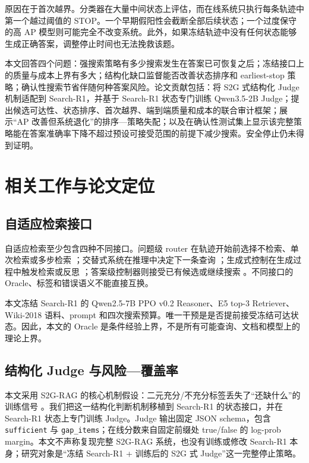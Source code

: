 \documentclass[UTF8,fontset=fandol,11pt,a4paper]{ctexart}
\newcommand{\model}[1]{\texttt{#1}}
\begin{document}
原因在于首次越界。分类器在大量中间状态上评估，而在线系统只执行每条轨迹中第一个越过阈值的 STOP。一个早期假阳性会截断全部后续状态；一个过度保守的高 AP 模型则可能完全不改变系统。此外，如果冻结轨迹中没有任何状态能够生成正确答案，调整停止时间也无法挽救该题。

本文回答四个问题：强搜索策略有多少搜索发生在答案已可恢复之后；冻结接口上的质量与成本上界有多大；结构化缺口监督能否改善状态排序和 earliest-stop 策略；确认性搜索节省伴随何种答案风险。论文贡献包括：将 S2G 式结构化 Judge 机制适配到 Search-R1，并基于 Search-R1 状态专门训练 Qwen3.5-2B Judge；提出候选可达性、状态排序、首次越界、端到端质量和成本的联合审计框架；展示“AP 改善但系统退化”的排序—策略失配；以及在确认性测试集上显示该完整策略能在答案准确率下降不超过预设可接受范围的前提下减少搜索。安全停止仍未得到证明。

\section{相关工作与论文定位}

\subsection{自适应检索接口}

自适应检索至少包含四种不同接口。问题级 router 在轨迹开始前选择不检索、单次检索或多步检索 \citep{jeong2024adaptiverag}；交替式系统在推理中决定下一条查询 \citep{trivedi2023ircot,jin2025searchr1}；生成式控制在生成过程中触发检索或反思 \citep{asai2023selfrag}；答案级控制器则接受已有候选或继续搜索 \citep{yang2025simrag}。不同接口的 Oracle、标签和错误语义不能直接互换。

本文冻结 Search-R1 的 Qwen2.5-7B PPO v0.2 Reasoner、E5 top-3 Retriever、Wiki-2018 语料、prompt 和四次搜索预算。唯一干预是是否提前接受冻结可达状态。因此，本文的 Oracle 是条件经验上界，不是所有可能查询、文档和模型上的理论上界。

\subsection{结构化 Judge 与风险—覆盖率}

本文采用 S2G-RAG 的核心机制假设：二元充分/不充分标签丢失了“还缺什么”的训练信号 \citep{li2026s2grag}。我们把这一结构化判断机制移植到 Search-R1 的状态接口，并在 Search-R1 状态上专门训练 Judge。Judge 输出固定 JSON schema，包含 \model{sufficient} 与 \model{gap\_items}；在线分数来自固定前缀处 true/false 的 log-prob margin。本文不声称复现完整 S2G-RAG 系统，也没有训练或修改 Search-R1 本身；研究对象是“冻结 Search-R1 + 训练后的 S2G 式 Judge”这一完整停止策略。
\end{document}
